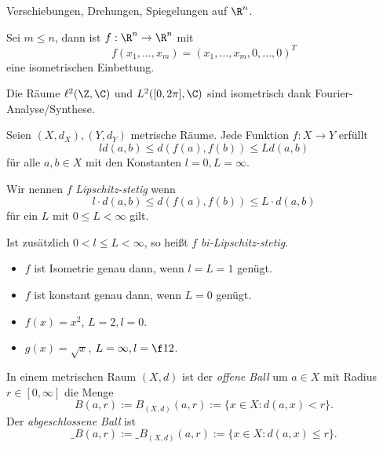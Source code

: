 \begin{ex}
	Verschiebungen, Drehungen, Spiegelungen auf $\R^n$.
\end{ex}

\begin{ex}
	Sei $m \le n$, dann ist	$f: \R^n \to \R^n$ mit
	\[
		f(x_1, \dotsc, x_m) = (x_1, \dotsc, x_m, 0, \dotsc, 0)^T
	\]
	eine isometrischen Einbettung.
\end{ex}

\begin{ex}
	Die Räume $\ell^2(\Z, \C)$ und $L^2([0,2\pi], \C)$ sind isometrisch dank Fourier-Analyse/Synthese.
\end{ex}

Seien $(X,d_X), (Y,d_Y)$ metrische Räume.
Jede Funktion $f : X \to Y$ erfüllt
\[
	l d(a,b) \le d(f(a), f(b)) \le L d(a,b)
\]
für alle $a,b \in X$ mit den Konstanten $l=0, L = \infty$.

\begin{df}
	Wir nennen $f$ \emph{Lipschitz-stetig} wenn
	\[
		l \cdot d(a,b) \le d(f(a), f(b)) \le L \cdot d(a,b)
	\]
	für ein $L$ mit $0 \le L < \infty$ gilt.

	Ist zusätzlich $0 < l \le L < \infty$, so heißt $f$ \emph{bi-Lipschitz-stetig}.
\end{df}

\begin{ex}
	\begin{itemize}
		\item
			$f$ ist Isometrie genau dann, wenn $l=L=1$ genügt.
		\item
			$f$ ist konstant genau dann, wenn $L=0$ genügt.
	\end{itemize}
\end{ex}

\begin{ex}
	\begin{itemize}
		\item
			$f(x) = x^2$, $L=2, l=0$.
		\item
			$g(x) = \sqrt{x}$, $L=\infty, l=\f 12$.
	\end{itemize}
\end{ex}

\begin{df}
	In einem metrischen Raum $(X,d)$ ist der \emph{offene Ball} um $a \in X$ mit Radius $r\in [0,\infty]$ die Menge
	\[
		B(a,r) := B_{(X,d)}(a, r) := \{ x \in X : d(a,x) < r \}.
	\]
	Der \emph{abgeschlossene Ball} ist
	\[
		\_{B}(a,r) := \_{B}_{(X,d)}(a, r) := \{ x \in X : d(a,x) \le r \}.
	\]
\end{df}

